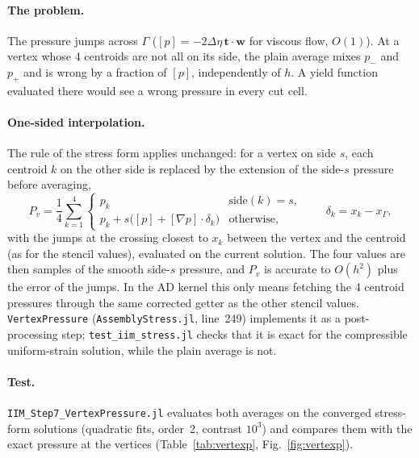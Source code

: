 \documentclass[11pt,a4paper]{article}
\newcommand{\code}[1]{\texttt{#1}}
\begin{document}
\paragraph{The problem.} The pressure jumps across $\Gamma$ ($[p]=-2\Delta\eta\,\mathbf t\cdot
\mathbf w$ for viscous flow, $O(1)$). At a vertex whose 4 centroids are not all on its side, the
plain average mixes $p_-$ and $p_+$ and is wrong by a fraction of $[p]$, independently of $h$. A
yield function evaluated there would see a wrong pressure in every cut cell.

\paragraph{One-sided interpolation.} The rule of the stress form applies unchanged: for a vertex on
side $s$, each centroid $k$ on the other side is replaced by the extension of the side-$s$
pressure before averaging,
\[
P_v=\frac14\sum_{k=1}^{4}\begin{cases}p_k & \text{side}(k)=s,\\[2pt]
p_k+s\bigl([p]+[\nabla p]\cdot\delta_k\bigr) & \text{otherwise,}\end{cases}
\qquad \delta_k=x_k-x_\Gamma,
\]
with the jumps at the crossing closest to $x_k$ between the vertex and the centroid (as for the
stencil values), evaluated on the current solution. The four values are then samples of the smooth
side-$s$ pressure, and $P_v$ is accurate to $O(h^2)$ plus the error of the jumps. In the AD kernel
this only means fetching the 4 centroid pressures through the same corrected getter as the
other stencil values. \code{VertexPressure} (\code{AssemblyStress.jl}, line~249) implements it as
a post-processing step; \code{test\_iim\_stress.jl} checks that it is exact for the
compressible uniform-strain solution, while the plain average is not.

\paragraph{Test.} \code{IIM\_Step7\_VertexPressure.jl} evaluates both averages on the converged
stress-form solutions (quadratic fits, order~2, contrast $10^3$) and compares them with the exact
pressure at the vertices (Table~\ref{tab:vertexp}, Fig.~\ref{fig:vertexp}).
\end{document}
